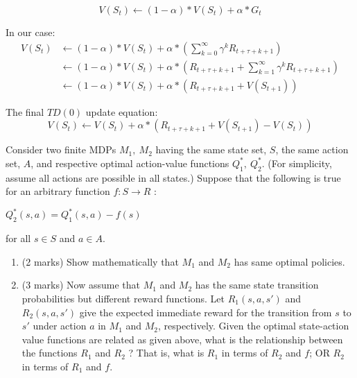 \documentclass[addpoints,12pt,solution]{exam}
\begin{document}
\begin{questions}
\begin{enumerate}[label=(\alph*)]
\begin{solution}
\[V(S_t) \leftarrow (1-\alpha) * V(S_t) + \alpha * G_t\]

In our case:
\begin{align*}
V(S_t) &\leftarrow (1-\alpha) * V(S_t) + \alpha * ( \sum_{k=0}^{\infty} \gamma^{k}R_{t + \tau + k + 1})\\
    &\leftarrow (1-\alpha) * V(S_t) + \alpha * (R_{t + \tau + k + 1} +  \sum_{k=1}^{\infty} \gamma^{k}R_{t + \tau + k + 1})\\
    &\leftarrow (1-\alpha) * V(S_t) + \alpha * (R_{t + \tau + k + 1} +  V(S_{t + 1}))
\end{align*}

    The final $TD(0)$ update equation:
    \[
        V(S_t) \leftarrow V(S_t) + \alpha * (R_{t + \tau + k + 1} +  V(S_{t + 1}) - V(S_t))
    \]


\end{solution}
\end{enumerate}

 Consider two finite MDPs $M_1,\ M_2$ having the same state set, $S$, the same action set, $A$, and respective optimal action-value functions $Q^*_1,\ Q^*_2$. (For simplicity, assume all actions are possible in all states.) Suppose that the following is true for an arbitrary function $f: S \rightarrow R$ :\\
\begin{center}
$Q^*_2(s, a) = Q^*_1(s, a) - f(s)$
\end{center}
for all $s \in S$ and $a \in A$.
\begin{enumerate}[label=(\alph*)]
\item (2 marks) Show mathematically that $M_1$ and $M_2$ has same optimal policies.
\begin{solution}

\end{solution}

\item (3 marks) Now assume that $M_1$ and $M_2$ has the same state transition probabilities but different reward functions. Let $R_1(s, a, s')$ and $R_2(s, a, s')$ give the expected immediate reward for the transition from $s$ to $s'$ under action $a$ in $M_1$ and $M_2$, respectively. Given the optimal state-action value functions are related as given above, what is the relationship between the functions $R_1$ and $R_2$ ? That is, what is $R_1$ in terms of $R_2$ and $f$; OR $R_2$ in terms of $R_1$ and $f$.

\begin{solution}


\end{solution}
\end{enumerate}
\end{questions}
\end{document}
